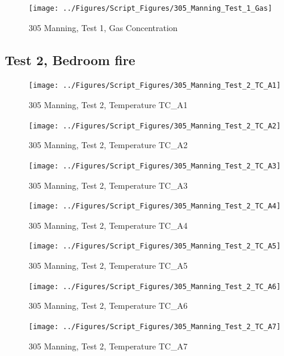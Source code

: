 \documentclass[12pt,oneside]{book}
\begin{document}
\begin{figure}[!ht]
\texttt{[image: ../Figures/Script\_Figures/305\_Manning\_Test\_1\_Gas]}
\caption{305 Manning, Test 1, Gas Concentration}
\label{fig:305_Manning_Test_1_Gas}
\end{figure}


\clearpage


\subsection{Test 2, Bedroom fire}

\begin{figure}[!ht]
\texttt{[image: ../Figures/Script\_Figures/305\_Manning\_Test\_2\_TC\_A1]}
\caption{305 Manning, Test 2, Temperature TC\_A1}
\label{fig:305_Manning_Test_2_TC_A1}
\end{figure}

\begin{figure}[!ht]
\texttt{[image: ../Figures/Script\_Figures/305\_Manning\_Test\_2\_TC\_A2]}
\caption{305 Manning, Test 2, Temperature TC\_A2}
\label{fig:305_Manning_Test_2_TC_A2}
\end{figure}

\begin{figure}[!ht]
\texttt{[image: ../Figures/Script\_Figures/305\_Manning\_Test\_2\_TC\_A3]}
\caption{305 Manning, Test 2, Temperature TC\_A3}
\label{fig:305_Manning_Test_2_TC_A3}
\end{figure}

\begin{figure}[!ht]
\texttt{[image: ../Figures/Script\_Figures/305\_Manning\_Test\_2\_TC\_A4]}
\caption{305 Manning, Test 2, Temperature TC\_A4}
\label{fig:305_Manning_Test_2_TC_A4}
\end{figure}

\begin{figure}[!ht]
\texttt{[image: ../Figures/Script\_Figures/305\_Manning\_Test\_2\_TC\_A5]}
\caption{305 Manning, Test 2, Temperature TC\_A5}
\label{fig:305_Manning_Test_2_TC_A5}
\end{figure}

\begin{figure}[!ht]
\texttt{[image: ../Figures/Script\_Figures/305\_Manning\_Test\_2\_TC\_A6]}
\caption{305 Manning, Test 2, Temperature TC\_A6}
\label{fig:305_Manning_Test_2_TC_A6}
\end{figure}

\begin{figure}[!ht]
\texttt{[image: ../Figures/Script\_Figures/305\_Manning\_Test\_2\_TC\_A7]}
\caption{305 Manning, Test 2, Temperature TC\_A7}
\label{fig:305_Manning_Test_2_TC_A7}
\end{figure}
\end{document}
